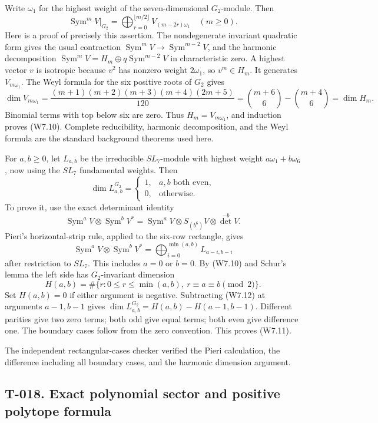 \documentclass[
  10pt,
]{article}
\begin{document}
Write \(\omega_1\) for the highest weight of the seven-dimensional
\(G_2\)-module. Then \[
\operatorname{Sym}^mV|_{G_2}
=\bigoplus_{r=0}^{\lfloor m/2\rfloor}V_{(m-2r)\omega_1}
\quad(m\ge0).
\tag{W7.10}
\] Here is a proof of precisely this assertion. The nondegenerate
invariant quadratic form gives the usual contraction
\(\operatorname{Sym}^mV\to\operatorname{Sym}^{m-2}V\), and the harmonic
decomposition
\(\operatorname{Sym}^mV=H_m\oplus q\operatorname{Sym}^{m-2}V\) in
characteristic zero. A highest vector \(v\) is isotropic because \(v^2\)
has nonzero weight \(2\omega_1\), so \(v^m\in H_m\). It generates
\(V_{m\omega_1}\). The Weyl formula for the six positive roots of
\(G_2\) gives \[
\dim V_{m\omega_1}
=\frac{(m+1)(m+2)(m+3)(m+4)(2m+5)}{120}
=\binom{m+6}{6}-\binom{m+4}{6}
=\dim H_m.
\] Binomial terms with top below six are zero. Thus
\(H_m=V_{m\omega_1}\), and induction proves (W7.10). Complete
reducibility, harmonic decomposition, and the Weyl formula are the
standard background theorems used here.

For \(a,b\ge0\), let \(L_{a,b}\) be the irreducible \(SL_7\)-module with
highest weight \(a\omega_1+b\omega_6\), now using the \(SL_7\)
fundamental weights. Then \[
\boxed{\dim L_{a,b}^{G_2}
=\begin{cases}1,&a,b\text{ both even},\\0,&\text{otherwise}.\end{cases}}
\tag{W7.11}
\] To prove it, use the exact determinant identity \[
\operatorname{Sym}^aV\otimes\operatorname{Sym}^bV^*
=\operatorname{Sym}^aV\otimes S_{(b^6)}V\otimes\det^{-b}V.
\] Pieri's horizontal-strip rule, applied to the six-row rectangle,
gives \[
\operatorname{Sym}^aV\otimes\operatorname{Sym}^bV^*
=\bigoplus_{i=0}^{\min(a,b)}L_{a-i,b-i}
\tag{W7.12}
\] after restriction to \(SL_7\). This includes \(a=0\) or \(b=0\). By
(W7.10) and Schur's lemma the left side has \(G_2\)-invariant dimension
\[
H(a,b)=\#\{r:0\le r\le\min(a,b),\ r\equiv a\equiv b\pmod2\}.
\] Set \(H(a,b)=0\) if either argument is negative. Subtracting (W7.12)
at arguments \(a-1,b-1\) gives \(\dim L_{a,b}^{G_2}=H(a,b)-H(a-1,b-1)\).
Different parities give two zero terms; both odd give equal terms; both
even give difference one. The boundary cases follow from the zero
convention. This proves (W7.11).

The independent rectangular-cases checker verified the Pieri
calculation, the difference including all boundary cases, and the
harmonic dimension argument.

\subsection{T-018. Exact polynomial sector and positive polytope
formula}\label{t-018.-exact-polynomial-sector-and-positive-polytope-formula}
\end{document}
